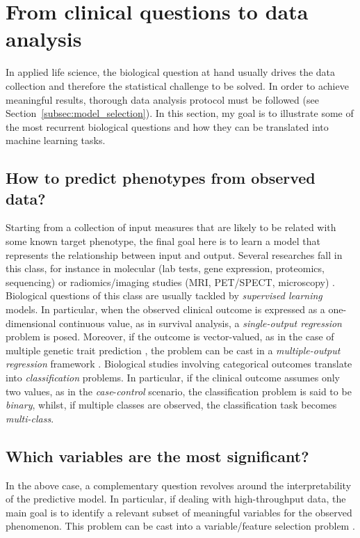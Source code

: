 \section{From clinical questions to data analysis} \label{sec:clinical_to_data}
In applied life science, the biological question at hand usually drives the data collection and therefore the statistical challenge to be solved. In order to achieve meaningful results, thorough data analysis protocol must be followed (see Section~\ref{subsec:model_selection}).
In this section, my goal is to illustrate some of the most recurrent biological questions and how they can be translated into machine learning tasks.


\subsection{How to predict phenotypes from observed data?} %
Starting from a collection of input measures that are likely to be related with some known target phenotype, the final goal here is to learn a model that represents the relationship between input and output. Several researches fall in this class, for instance in molecular (\eg lab tests, gene expression, proteomics, sequencing) \cite{angermueller2016deep, okser2014regularized, abraham2013performance} or radiomics/imaging studies (\eg MRI, PET/SPECT, microscopy) \cite{min2016deep, helmstaedter2013connectomic}. Biological questions of this class are usually tackled by \textit{supervised learning} models. In particular, when the observed clinical outcome is expressed as a one-dimensional continuous value, as in survival analysis, a \textit{single-output regression} problem is posed. Moreover, if the outcome is vector-valued, as in the case of multiple genetic trait prediction \cite{he2016novel}, the problem can be cast in a \textit{multiple-output regression }framework \cite{argyriou2008convex, baldassarre2012multi}. Biological studies involving categorical outcomes translate into \textit{classification} problems. In particular, if the clinical outcome assumes only two values, as in the \textit{case}-\textit{control} scenario, the classification problem is said to be \textit{binary}, whilst, if multiple classes are observed, the classification task becomes \textit{multi-class}.

\subsection{Which variables are the most significant?} %
In the above case, a complementary question revolves around the interpretability of the predictive model. In particular, if dealing with high-throughput data, the main goal is to identify a relevant subset of meaningful variables for the observed phenomenon. This problem can be cast into a variable/feature selection problem \cite{guyon2002gene}. %

